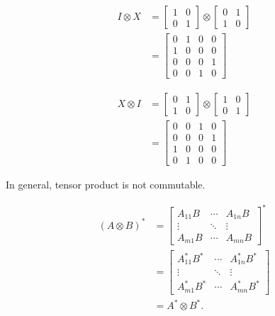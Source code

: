 \begin{align*}
	I \otimes X &= \begin{bmatrix}
		1 & 0 \\ 
		0 & 1
	\end{bmatrix}
	\otimes
	\begin{bmatrix}
		0 & 1 \\ 
		1 & 0
	\end{bmatrix}\\
	&=
	\begin{bmatrix}
	0 & 1 & 0 & 0 \\ 
	1 & 0 & 0 & 0 \\ 
	0 & 0 & 0 & 1 \\ 
	0 & 0 & 1 & 0
	\end{bmatrix}
\end{align*}

\begin{align*}
	X \otimes I &= \begin{bmatrix}
		0 & 1 \\ 
		1 & 0
	\end{bmatrix}
	\otimes
	\begin{bmatrix}
		1 & 0 \\ 
		0 & 1
	\end{bmatrix}\\
	&= \begin{bmatrix}
	0 & 0 & 1 & 0 \\ 
	0 & 0 & 0 & 1 \\ 
	1 & 0 & 0 & 0 \\ 
	0 & 1 & 0 & 0
	\end{bmatrix}
\end{align*}

In general, tensor product is not commutable.



\begin{align*}
	(A \otimes B)^*
	&=
	\begin{bmatrix}
		A_{11} B & \cdots & A_{1n} B \\ 
		\vdots & \ddots  & \vdots \\ 
		A_{m1}B & \cdots & A_{mn} B
	\end{bmatrix}^* \\
	&=
	\begin{bmatrix}
		A_{11}^* B^* & \cdots & A_{1n}^* B^* \\ 
		\vdots & \ddots  & \vdots \\ 
		A_{m1}^* B^* & \cdots & A_{mn}^* B^*
	\end{bmatrix} \\
	&= A^* \otimes B^*.
\end{align*}


